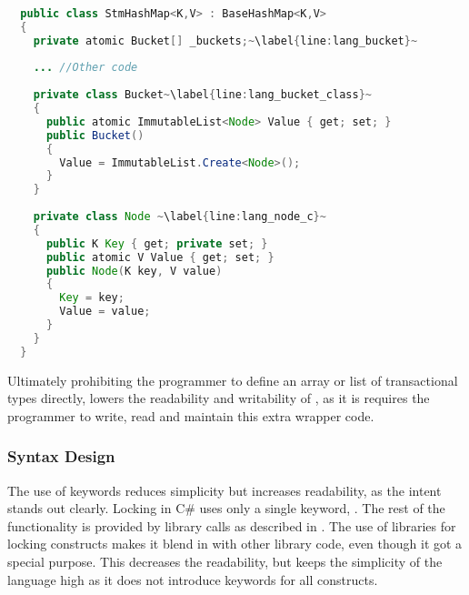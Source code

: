 \begin{lstlisting}[label=lst:lang_Buckets,
  caption={HashMap Buckets Array - \stmname},
  language=Java,  
  showspaces=false,
  showtabs=false,
  breaklines=true,
  showstringspaces=false,
  breakatwhitespace=true,
  escapechar=~,
  commentstyle=\color{greencomments},
  keywordstyle=\color{bluekeywords},
  stringstyle=\color{redstrings},
  morekeywords={atomic, retry, orelse, var, get, set, ref, out}]  % Start your code-block
  
  public class StmHashMap<K,V> : BaseHashMap<K,V>
  {
    private atomic Bucket[] _buckets;~\label{line:lang_bucket}~
  
    ... //Other code
    
    private class Bucket~\label{line:lang_bucket_class}~
    {
      public atomic ImmutableList<Node> Value { get; set; }
      public Bucket()
      {
        Value = ImmutableList.Create<Node>();
      }
    }
  
    private class Node ~\label{line:lang_node_c}~
    {
      public K Key { get; private set; }
      public atomic V Value { get; set; }
      public Node(K key, V value)
      {
        Key = key;
        Value = value;
      }
    }
  }
\end{lstlisting}

Ultimately prohibiting the programmer to define an array or list of transactional types directly, lowers the readability and writability of \stmname, as it is requires the programmer to write, read and maintain this extra wrapper code.

\subsubsection{Syntax Design}\label{subsec:syntaxdesign}
The use of keywords reduces simplicity but increases readability, as the intent stands out clearly\cite[p. 12-13]{sebestaProLang}. Locking in C\# uses only a single keyword, . The rest of the functionality is provided by library calls as described in . The use of libraries for locking constructs makes it blend in with other library code, even though it got a special purpose. This decreases the readability, but keeps the simplicity of the language high as it does not introduce keywords for all constructs. 

